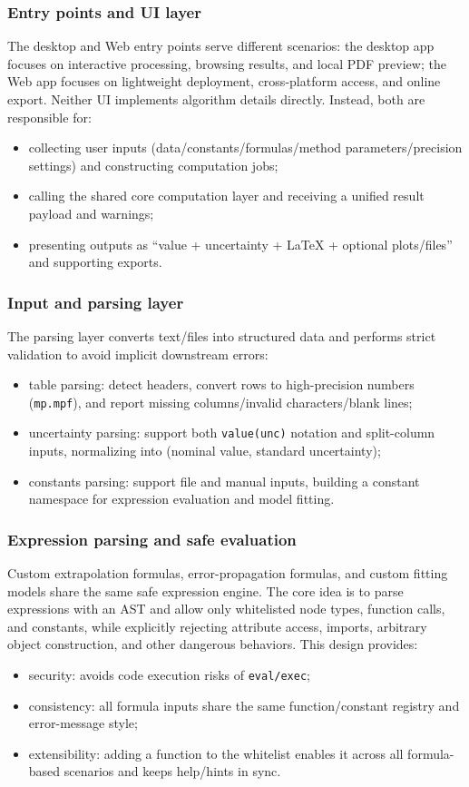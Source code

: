 \documentclass[a4paper,11pt]{article}
\begin{document}
\subsubsection{Entry points and UI layer}
The desktop and Web entry points serve different scenarios: the desktop app focuses on interactive processing, browsing results, and local PDF preview; the Web app focuses on lightweight deployment, cross-platform access, and online export. Neither UI implements algorithm details directly. Instead, both are responsible for:
\begin{itemize}
  \item collecting user inputs (data/constants/formulas/method parameters/precision settings) and constructing computation jobs;
  \item calling the shared core computation layer and receiving a unified result payload and warnings;
  \item presenting outputs as ``value + uncertainty + LaTeX + optional plots/files'' and supporting exports.
\end{itemize}

\subsubsection{Input and parsing layer}
The parsing layer converts text/files into structured data and performs strict validation to avoid implicit downstream errors:
\begin{itemize}
  \item table parsing: detect headers, convert rows to high-precision numbers (\texttt{mp.mpf}), and report missing columns/invalid characters/blank lines;
  \item uncertainty parsing: support both \texttt{value(unc)} notation and split-column inputs, normalizing into (nominal value, standard uncertainty);
  \item constants parsing: support file and manual inputs, building a constant namespace for expression evaluation and model fitting.
\end{itemize}

\subsubsection{Expression parsing and safe evaluation}
Custom extrapolation formulas, error-propagation formulas, and custom fitting models share the same safe expression engine. The core idea is to parse expressions with an AST and allow only whitelisted node types, function calls, and constants, while explicitly rejecting attribute access, imports, arbitrary object construction, and other dangerous behaviors. This design provides:
\begin{itemize}
  \item security: avoids code execution risks of \texttt{eval/exec};
  \item consistency: all formula inputs share the same function/constant registry and error-message style;
  \item extensibility: adding a function to the whitelist enables it across all formula-based scenarios and keeps help/hints in sync.
\end{itemize}
\end{document}
